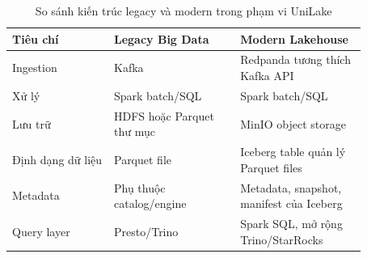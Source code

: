 \begin{table}[htbp]
\centering
\caption{So sánh kiến trúc legacy và modern trong phạm vi UniLake}
\label{tab:architecture-comparison}
\begin{tabular}{p{0.25\linewidth}p{0.31\linewidth}p{0.31\linewidth}}
\toprule
Tiêu chí & Legacy Big Data & Modern Lakehouse \\
\midrule
Ingestion & Kafka & Redpanda tương thích Kafka API \\
Xử lý & Spark batch/SQL & Spark batch/SQL \\
Lưu trữ & HDFS hoặc Parquet thư mục & MinIO object storage \\
Định dạng dữ liệu & Parquet file & Iceberg table quản lý Parquet files \\
Metadata & Phụ thuộc catalog/engine & Metadata, snapshot, manifest của Iceberg \\
Query layer & Presto/Trino & Spark SQL, mở rộng Trino/StarRocks \\
\bottomrule
\end{tabular}
\end{table}
